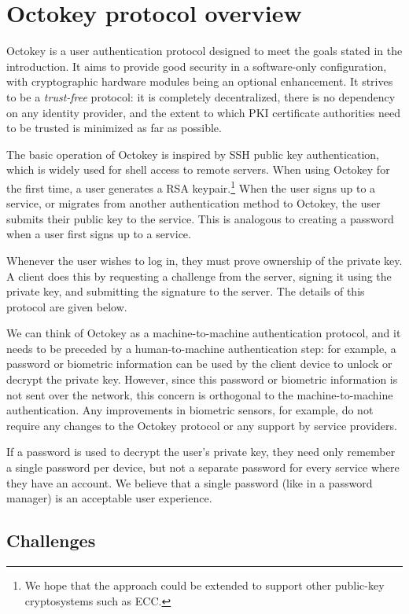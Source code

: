\section{Octokey protocol overview}\label{sec:protocol}

Octokey is a user authentication protocol designed to meet the goals stated in the introduction. It
aims to provide good security in a software-only configuration, with cryptographic hardware modules
being an optional enhancement. It strives to be a \emph{trust-free} protocol: it is completely
decentralized, there is no dependency on any identity provider, and the extent to which PKI
certificate authorities need to be trusted is minimized as far as possible.

The basic operation of Octokey is inspired by SSH public key authentication, which is widely used
for shell access to remote servers. When using Octokey for the first time, a user generates a RSA
keypair.\footnote{We hope that the approach could be extended to support other public-key
cryptosystems such as ECC.} When the user signs up to a service, or migrates from another
authentication method to Octokey, the user submits their public key to the service. This is
analogous to creating a password when a user first signs up to a service.

Whenever the user wishes to log in, they must prove ownership of the private key. A client does this
by requesting a challenge from the server, signing it using the private key, and submitting the
signature to the server. The details of this protocol are given below.

We can think of Octokey as a machine-to-machine authentication protocol, and it needs to be preceded
by a human-to-machine authentication step: for example, a password or biometric information can be
used by the client device to unlock or decrypt the private key. However, since this password or
biometric information is not sent over the network, this concern is orthogonal to the
machine-to-machine authentication. Any improvements in biometric sensors, for example, do not
require any changes to the Octokey protocol or any support by service providers.

If a password is used to decrypt the user's private key, they need only remember a single password
per device, but not a separate password for every service where they have an account. We believe
that a single password (like in a password manager) is an acceptable user experience.

\subsection{Challenges}\label{sec:challenges}

